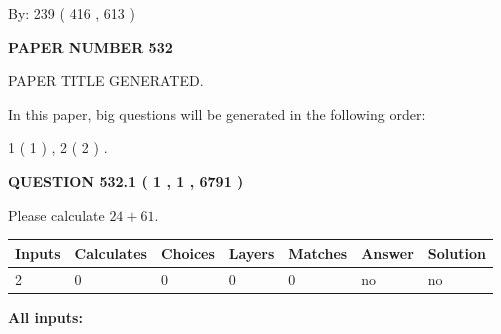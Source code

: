 \documentclass[12pt]{article}
\begin{document}
   
\hspace{1.0in} By: 
 239 ( 416 ,  613 )
   
   
   
   
\newpage 
\setcounter{page}{ 
   532001 } 
   
   
   
   
 {\textbf{ \Large{ PAPER NUMBER  532  }}}
   
   
\vspace{0.2in}
   
   
   
   
   
   
   
   
 \vspace{0.2in}
 
 
 
 
   
   
 PAPER TITLE GENERATED.
   
   
   
\vspace{0.2in}
   
In this paper, big questions will be generated in the following order: 
   
   
   1 ( 1 )
 ,
   2 ( 2 )
 .
  
\vspace{0.2in}
  
{\textbf{\Large{QUESTION
532.1 
 ( 1 , 1 , 6791 )
}}}
  
  
 
Please calculate $ %
24 +  %
61 $.
 
 
   
   
   
   
\noindent\begin{tabular}{|l|l|l|l|l|l|l|}
 \hline
Inputs & Calculates & Choices & Layers & Matches & Answer & Solution \\ \hline
 2  & 
 0  & 
 0
  & 
 0  & 
 0  & 
  no & 
  no 
  \\ \hline
 \end{tabular}
   
   
   
   
\noindent{}
   
   
   
   
\noindent\vspace{0.1in}\hspace{-0.08in} {\textbf{\Large{All inputs: }}}
   
\end{document}
